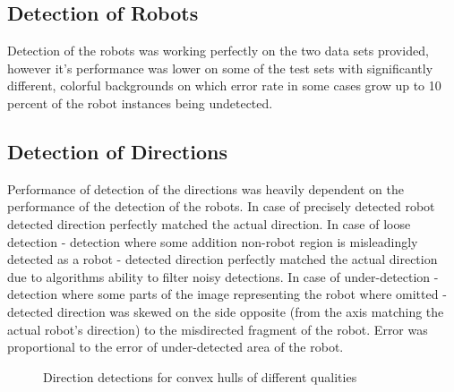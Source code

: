 \documentclass[10pt,a4paper]{article}
\begin{document}
\subsection{Detection of Robots}\label{colorresults}
Detection of the robots was working perfectly on the two data sets provided, 
however it's performance was lower on some of the test sets with significantly 
different, colorful backgrounds on which error rate in some cases grow up to 10 
percent of the robot instances being  undetected.

\subsection{Detection of Directions}\label{directionresults}
Performance of detection of the directions was heavily dependent on the 
performance of the detection of the robots. In case of precisely detected robot 
detected direction perfectly matched the actual direction. 
In case of loose detection - detection where some addition non-robot region is 
misleadingly detected as a robot - detected direction perfectly matched the 
actual direction due to algorithms ability to filter noisy detections. 
In case of under-detection - detection where some parts of the image 
representing the robot where omitted - detected direction was skewed on the 
side opposite (from the axis matching the actual robot's direction) to the 
misdirected fragment of the robot. Error was proportional to the error of 
under-detected area of the robot. 
\begin{figure}[ht]
    \begin{center}
    \end{center}
    \caption{Direction detections for convex hulls of different qualities}
\end{figure} 
\end{document}
